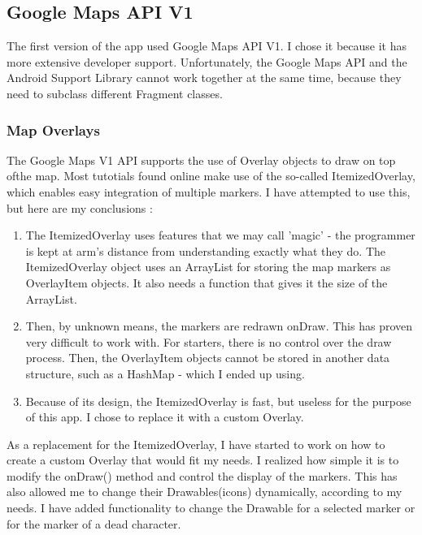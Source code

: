 \documentclass{article}
\begin{document}
\subsection{Google Maps API V1}

The first version of the app used Google Maps API V1. I chose it because it has
more extensive developer support. Unfortunately, the Google Maps API and the
Android Support Library cannot work together at the same time, because they need
to subclass different Fragment classes.

\subsubsection{Map Overlays}

The Google Maps V1 API supports the use of Overlay objects to draw on top
ofthe map. Most tutotials found online make use of the so-called
ItemizedOverlay, which enables easy integration of multiple markers. I have
attempted to use this, but here are my conclusions :\newline 
\begin{enumerate}
  \item The ItemizedOverlay uses features that we may call 'magic' - the
  programmer is kept at arm's distance from understanding exactly what they do.
  The ItemizedOverlay object uses an ArrayList for storing the map markers as
  OverlayItem objects. It also needs a function that gives it the size of the
  ArrayList. 
  
  \item Then, by unknown means, the markers are redrawn onDraw. This has
  proven very difficult to work with. For starters, there is no control over the
  draw process. Then, the OverlayItem objects cannot be stored in another data
  structure, such as a HashMap - which I ended up using.
  
  \item Because of its design, the ItemizedOverlay is fast, but useless for the
  purpose of this app. I chose to replace it with a custom Overlay.   
\end{enumerate}

As a replacement for the ItemizedOverlay, I have started to work on how to
create a custom Overlay that would fit my needs. I realized how simple it is to
modify the onDraw() method and control the display of the markers. This has also
allowed me to change their Drawables(icons) dynamically, according to my needs.
I have added functionality to change the Drawable for a selected marker or for
the marker of a dead character. \newline
\end{document}
